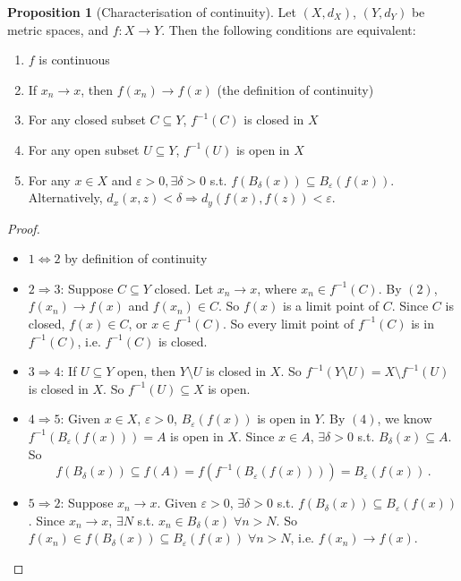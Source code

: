 \documentclass[a4paper,11pt]{article}
\theoremstyle{definition}
\newtheorem*{prop}{Proposition}
\numberwithin{equation}{section}
\begin{document}
\begin{prop}[Characterisation of continuity]
Let $(X,d_X)$, $(Y,d_Y)$ be metric spaces, and $f:X\rightarrow Y$. Then the following conditions are equivalent:
\begin{enumerate}
    \item $f$ is continuous
    \item If $x_n\rightarrow x$, then $f(x_n)\rightarrow f(x)$ (the definition of continuity)
    \item For any closed subset $C\subseteq Y$, $f^{-1}(C)$ is  closed in $X$
    \item For any open subset $U\subseteq Y$, $f^{-1}(U)$ is open in $X$
    \item For any $x\in X$ and $\varepsilon>0, \exists\delta>0$ s.t. $f(B_\delta(x))\subseteq B_\varepsilon(f(x))$. Alternatively, $d_x(x,z)<\delta\Rightarrow d_y(f(x),f(z))<\varepsilon$.
\end{enumerate}
\end{prop}

\begin{proof}
\leavevmode
\begin{itemize}
    \item $1\Leftrightarrow2$ by definition of continuity
    \item $2\Rightarrow3$: Suppose $C\subseteq Y$ closed. Let $x_n\rightarrow x$, where $x_n\in f^{-1}(C)$. By $(2)$, $f(x_n)\rightarrow f(x)$ and $f(x_n)\in C$. So $f(x)$ is a limit point of $C$. Since $C$ is closed, $f(x)\in C$, or $x\in f^{-1}(C)$. So every limit point of $f^{-1}(C)$ is in $f^{-1}(C)$, i.e. $f^{-1}(C)$ is closed.
    \item $3\Rightarrow4$: If $U\subseteq Y$ open, then $Y\setminus U$ is closed in $X$. So $f^{-1}(Y\setminus U) = X\setminus f^{-1}(U)$ is closed in $X$. So $f^{-1}(U)\subseteq X$ is open.
    \item $4\Rightarrow5$: Given $x\in X$, $\varepsilon>0$, $B_\varepsilon(f(x))$ is open in $Y$. By $(4)$, we know $f^{-1}(B_\varepsilon(f(x)))=A$ is open in $X$. Since $x\in A$, $\exists\delta>0$ s.t. $B_\delta(x)\subseteq A$. So 
    \begin{equation}
        f(B_\delta(x))\subseteq f(A)=f(f^{-1}(B_\varepsilon(f(x)))) = B_\varepsilon(f(x))\,.
    \end{equation}
    \item $5\Rightarrow2$: Suppose $x_n\rightarrow x$. Given $\varepsilon>0$, $\exists\delta>0$ s.t. $f(B_\delta(x))\subseteq B_\varepsilon(f(x))$. Since $x_n\rightarrow x$, $\exists N$ s.t. $x_n\in B_\delta(x)\;\forall n>N$. So $f(x_n)\in f(B_\delta(x))\subseteq B_\varepsilon(f(x))\;\forall n>N$, i.e. $f(x_n)\rightarrow f(x)$.
\end{itemize}
\end{proof}
\end{document}
